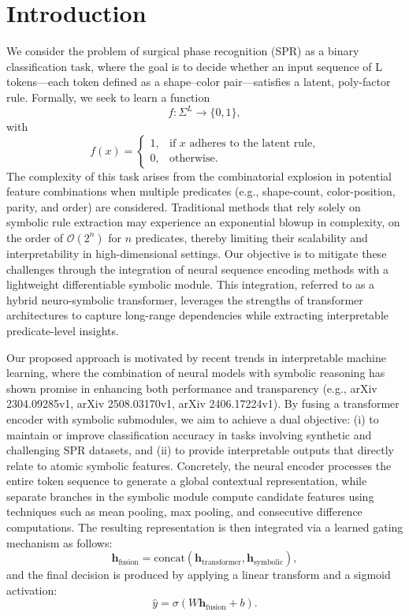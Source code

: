 \documentclass{article}
\begin{document}
\section{Introduction}
We consider the problem of surgical phase recognition (SPR) as a binary classification task, where the goal is to decide whether an input sequence of L tokens---each token defined as a shape–color pair---satisfies a latent, poly-factor rule. Formally, we seek to learn a function 
\[
f : \Sigma^L \to \{0,1\},
\]
with 
\[
f(x) = \begin{cases} 1, & \text{if } x \text{ adheres to the latent rule,} \\ 0, & \text{otherwise.} \end{cases}
\]
The complexity of this task arises from the combinatorial explosion in potential feature combinations when multiple predicates (e.g., shape-count, color-position, parity, and order) are considered. Traditional methods that rely solely on symbolic rule extraction may experience an exponential blowup in complexity, on the order of \(\mathcal{O}(2^n)\) for \(n\) predicates, thereby limiting their scalability and interpretability in high-dimensional settings. Our objective is to mitigate these challenges through the integration of neural sequence encoding methods with a lightweight differentiable symbolic module. This integration, referred to as a hybrid neuro-symbolic transformer, leverages the strengths of transformer architectures to capture long-range dependencies while extracting interpretable predicate-level insights.

Our proposed approach is motivated by recent trends in interpretable machine learning, where the combination of neural models with symbolic reasoning has shown promise in enhancing both performance and transparency (e.g., arXiv 2304.09285v1, arXiv 2508.03170v1, arXiv 2406.17224v1). By fusing a transformer encoder with symbolic submodules, we aim to achieve a dual objective: (i) to maintain or improve classification accuracy in tasks involving synthetic and challenging SPR datasets, and (ii) to provide interpretable outputs that directly relate to atomic symbolic features. Concretely, the neural encoder processes the entire token sequence to generate a global contextual representation, while separate branches in the symbolic module compute candidate features using techniques such as mean pooling, max pooling, and consecutive difference computations. The resulting representation is then integrated via a learned gating mechanism as follows:
\[
\mathbf{h}_{\text{fusion}} = \text{concat}(\mathbf{h}_{\text{transformer}}, \mathbf{h}_{\text{symbolic}}),
\]
and the final decision is produced by applying a linear transform and a sigmoid activation:
\[
\hat{y} = \sigma(W \mathbf{h}_{\text{fusion}} + b).
\]
\end{document}
